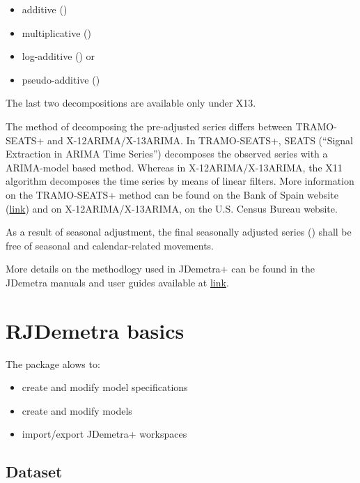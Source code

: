 \documentclass[article]{jss}
\providecommand{\tightlist}{%
  \setlength{\itemsep}{0pt}\setlength{\parskip}{0pt}}
\begin{document}
\begin{itemize}
\tightlist
\item
  additive ()
\item
  multiplicative ()
\item
  log-additive () or
\item
  pseudo-additive ()
\end{itemize}

The last two decompositions are available only under X13.

The method of decomposing the pre-adjusted series differs between
TRAMO-SEATS+ and X-12ARIMA/X-13ARIMA. In TRAMO-SEATS+, SEATS (``Signal
Extraction in ARIMA Time Series'') decomposes the observed series with a
ARIMA-model based method. Whereas in X-12ARIMA/X-13ARIMA, the X11
algorithm decomposes the time series by means of linear filters. More
information on the TRAMO-SEATS+ method can be found on the Bank of Spain
website (\href{www.bde.es}{link}) and on X-12ARIMA/X-13ARIMA, on the
U.S. Census Bureau website.

As a result of seasonal adjustment, the final seasonally adjusted series
() shall be free of seasonal and calendar-related movements.

More details on the methodlogy used in JDemetra+ can be found in the
JDemetra manuals and user guides available at
\href{https://ec.europa.eu/eurostat/cros/content/documentation_en}{link}.

\hypertarget{rjdemetra-basics}{%
\section{RJDemetra basics}\label{rjdemetra-basics}}

The  package alows to:

\begin{itemize}
\tightlist
\item
  create and modify model specifications
\item
  create and modify models
\item
  import/export JDemetra+ workspaces
\end{itemize}

\hypertarget{dataset}{%
\subsection{Dataset}\label{dataset}}
\end{document}
